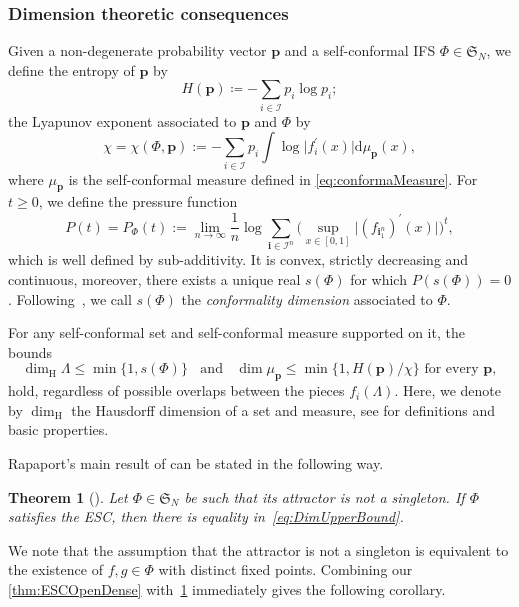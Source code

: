 \documentclass[11pt,a4paper]{article}
\def\cref#1{\ref{#1}}%
\newtheorem{theorem}{Theorem}[section]
\theoremstyle{definition}
\theoremstyle{remark}
\newcommand{\0}{\mathbf{0}}
\newcommand{\bi}{\mathbf{i}}
\numberwithin{equation}{section}
\begin{document}
\subsubsection{Dimension theoretic consequences}
Given a non-degenerate probability vector $\mathbf{p}$ and a self-conformal IFS $\Phi\in
\mathfrak{S}_N$, we define the entropy of $\mathbf{p}$ by
\begin{equation*}
H(\mathbf{p})\coloneqq -\sum_{i\in\mathcal{I}} p_i\log p_i;
\end{equation*}
the Lyapunov exponent associated to $\mathbf{p}$ and $\Phi$ by
\begin{equation*}
\chi=\chi(\Phi,\mathbf{p}):=-\sum_{i \in \mathcal{I}} p_i \int \log \big|f_{i}^{'}(x)\big|
\mathrm{d} \mu_{\mathbf{p}}(x),
\end{equation*}
where $\mu_{\mathbf{p}}$ is the self-conformal measure defined in \cref{eq:conformaMeasure}.
For $t\geq 0$, we define the pressure function
\begin{equation*}
P(t)=P_{\Phi}(t):=\lim _{n \rightarrow \infty} \frac{1}{n} \log \sum_{\bi \in
\mathcal{I}^n} \Big(\sup_{x\in[0,1]} \big|(f_{\bi_1^n})^{\prime}(x)\big|\Big)^t,
\end{equation*}
which is well defined by sub-additivity. It is convex, strictly decreasing and continuous, moreover,
there exists a unique real $s(\Phi)$ for which $P(s(\Phi))=0$.
Following~\cite[Chapter~14]{BaranySimonSolomyak_Book23}, we call $s(\Phi)$ the \emph{conformality
dimension} associated to $\Phi$. 

For any self-conformal set and self-conformal measure supported on it, the bounds
\begin{equation}\label{eq:DimUpperBound}
\dim_{\mathrm{H}} \Lambda \leq \min\{1,s(\Phi)\}  \;\;\text{ and }\;\; \dim \mu_{\mathbf{p}} \leq
\min\{1, H(\mathbf{p})/\chi\} \text{ for every } \mathbf{p},
\end{equation} 
hold, regardless of possible overlaps between the pieces $f_i(\Lambda)$.
Here, we denote by $\dim_{\mathrm H}$ the Hausdorff dimension of a set and measure, see
\cite{FalconerBook} for definitions and basic properties.

Rapaport's main result of \cite{Rapaport_SelfConfESC25arXiv}
can be stated in the following way.

\begin{theorem}[\cite{Rapaport_SelfConfESC25arXiv}]\label{thm:RapaportMain}
  Let $\Phi\in\mathfrak{S}_N$ be such that its attractor is not a singleton. If
  $\Phi$ satisfies the ESC, then there is equality in~\cref{eq:DimUpperBound}.
\end{theorem}
We note that the assumption that the attractor is not a singleton is equivalent to the existence of
$f,g\in\Phi$ with distinct fixed points.
Combining our \cref{thm:ESCOpenDense} with~\cref{thm:RapaportMain} immediately gives the following corollary.
\end{document}

